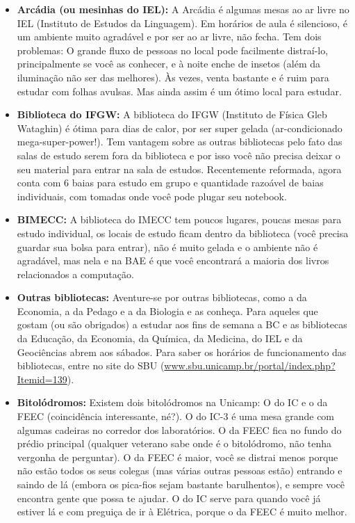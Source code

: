 \begin{itemize}
    \item  \textbf{Arcádia (ou mesinhas do IEL):} A Arcádia é algumas mesas ao
        ar livre no IEL (Instituto de Estudos da Linguagem). Em horários de aula
        é silencioso, é um ambiente muito agradável e por ser ao ar livre, não
        fecha.  Tem dois problemas: O grande fluxo de pessoas no local pode
        facilmente distraí-lo, principalmente se você as conhecer, e à noite
        enche de insetos (além da iluminação não ser das melhores). Às vezes,
        venta bastante e é ruim para estudar com folhas avulsas. Mas ainda assim
        é um ótimo local para estudar.

    \item  \textbf{Biblioteca do IFGW:} A biblioteca do IFGW (Instituto de
        Física Gleb Wataghin) é ótima para dias de calor, por ser super gelada
        (ar-condicionado mega-super-power!). Tem vantagem sobre as outras
        bibliotecas pelo fato das salas de estudo serem fora da biblioteca e por
        isso você não precisa deixar o seu material para entrar na sala de
        estudos. Recentemente reformada, agora conta com 6 baias para estudo em
        grupo e quantidade razoável de baias individuais, com tomadas onde você
        pode plugar seu notebook.

    \item  \textbf{BIMECC:} A biblioteca do IMECC tem poucos lugares, poucas
        mesas para estudo individual, os locais de estudo ficam dentro da
        biblioteca (você precisa guardar sua bolsa para entrar), não é muito
        gelada e o ambiente não é agradável, mas nela e na BAE é que você
        encontrará a maioria dos livros relacionados a computação.

    \item  \textbf{Outras bibliotecas:} Aventure-se por outras bibliotecas, como
        a da Economia, a da Pedago e a da Biologia e as conheça. Para aqueles
        que gostam (ou são obrigados) a estudar aos fins de semana a BC e as
        bibliotecas da Educação, da Economia, da Química, da Medicina, do IEL e
        da Geociências abrem aos sábados. Para saber os horários de
        funcionamento das bibliotecas, entre no site do SBU
        (\url{www.sbu.unicamp.br/portal/index.php?Itemid=139}).

    \item  \textbf{Bitolódromos:} Existem dois bitolódromos na Unicamp: O do IC
        e o da FEEC (coincidência interessante, né?). O do IC-3 é uma mesa
        grande com algumas cadeiras no corredor dos laboratórios. O da FEEC fica
        no fundo do prédio principal (qualquer veterano sabe onde é o
        bitolódromo, não tenha vergonha de perguntar). O da FEEC é maior, você
        se distrai menos porque não estão todos os seus colegas (mas várias
        outras pessoas estão) entrando e saindo de lá (embora os pica-fios sejam
        bastante barulhentos), e sempre você encontra gente que possa te ajudar.
        O do IC serve para quando você já estiver lá e com preguiça de ir à
        Elétrica, porque o da FEEC é muito melhor.


\end{itemize}

